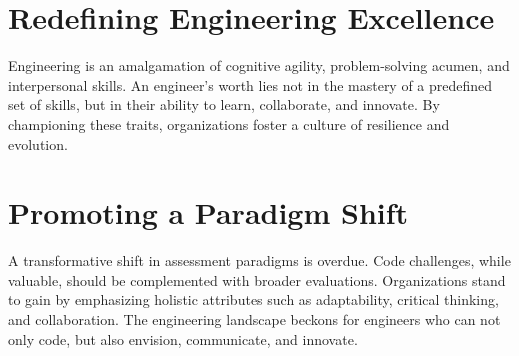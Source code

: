 \documentclass[
    a4paper, %
    10pt, %
    unnumberedsections, %
    twoside, %
]{LTJournalArticle}
\begin{document}

\section{Redefining Engineering Excellence}

Engineering is an amalgamation of cognitive agility, problem-solving acumen, and interpersonal skills. An engineer's worth lies not in the mastery of a predefined set of skills, but in their ability to learn, collaborate, and innovate. By championing these traits, organizations foster a culture of resilience and evolution.

\section{Promoting a Paradigm Shift}

A transformative shift in assessment paradigms is overdue. Code challenges, while valuable, should be complemented with broader evaluations. Organizations stand to gain by emphasizing holistic attributes such as adaptability, critical thinking, and collaboration. The engineering landscape beckons for engineers who can not only code, but also envision, communicate, and innovate.
\end{document}
